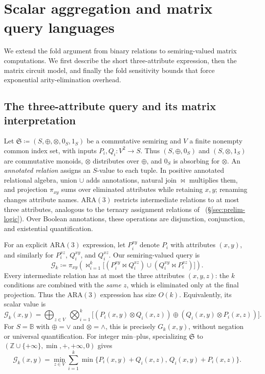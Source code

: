 \section{Scalar aggregation and matrix query languages}\label{sec:matrix}
We extend the fold argument from binary relations to semiring-valued
matrix computations. We first describe the short three-attribute
expression, then the matrix circuit model, and finally the fold
sensitivity bounds that force exponential arity-elimination overhead.

\subsection{The three-attribute query and its matrix interpretation}\label{sec:weightedG}
Let $\mathfrak S\coloneqq(S,\oplus,\otimes,0_S,1_S)$ be a commutative
semiring and $V$ a finite nonempty common index set, with inputs
$P_i,Q_i:V^2\to S$. Thus $(S,\oplus,0_S)$ and $(S,\otimes,1_S)$
are commutative monoids, $\otimes$ distributes over $\oplus$, and
$0_S$ is absorbing for $\otimes$.
An \emph{annotated relation} assigns an $S$-value to each tuple.
In positive annotated relational algebra, union $\cup$ adds annotations,
natural join $\bowtie$ multiplies them, and projection $\pi_{xy}$ sums
over eliminated attributes while retaining $x,y$; renaming changes
attribute names.
ARA$(3)$ restricts intermediate relations to at most three attributes,
analogous to the ternary assignment relations of \FOthree\
(\S\ref{sec:prelim-logic}). Over Boolean annotations, these operations
are disjunction, conjunction, and existential quantification.

For an explicit ARA$(3)$ expression, let $P_i^{xy}$ denote $P_i$
with attributes $(x,y)$, and similarly for $P_i^{xz}$, $Q_i^{xy}$,
and $Q_i^{xz}$. Our semiring-valued query is
\[
 \mathcal G_k\coloneqq\pi_{xy}\!\left(
 \mathop{\bowtie}_{i=1}^{k}
 \bigl[(P_i^{xy}\bowtie Q_i^{xz})
       \cup(Q_i^{xy}\bowtie P_i^{xz})\bigr]\right).
\]
Every intermediate relation has at most the three attributes
$(x,y,z)$: the $k$ conditions are combined with the \emph{same} $z$, which is
eliminated only at the final projection. Thus the ARA$(3)$ expression
has size $O(k)$. Equivalently, its scalar value is
\[
 \mathcal G_k(x,y)=\bigoplus_{z\in V}\ \bigotimes_{i=1}^{k}
 \bigl[(P_i(x,y)\otimes Q_i(x,z))
        \oplus(Q_i(x,y)\otimes P_i(x,z))\bigr].
\]
For $S=\mathbb B$ with $\oplus=\lor$ and $\otimes=\land$, this
is precisely $G_k(x,y)$, without negation or universal quantification.
For integer min--plus, specializing $\mathfrak S$ to
$(\mathbb Z\cup\{+\infty\},\min,+,+\infty,0)$ gives
\[
 \mathcal G_k(x,y)=\min_{z\in V}\sum_{i=1}^{k}
 \min\{P_i(x,y)+Q_i(x,z),\,Q_i(x,y)+P_i(x,z)\}.
\]

